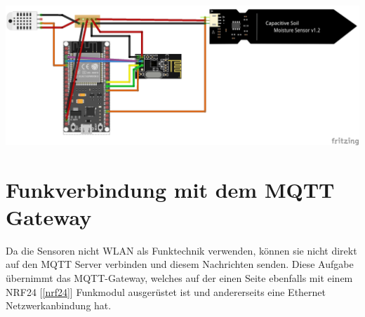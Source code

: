 \documentclass[
  12pt, %
  a4paper, %
  twoside, %
  openany, %
  numbers=noenddot, %
  BCOR=5mm, %
  parskip=half*, %
  thesis, %
]{bfhbook}
\begin{document}
  \begin{center}
    \includegraphics[width=17cm, left]{Bilder/Sensor-Design_Steckplatine.png}
    \captionsetup{justification=centering}
   \end{center}


 \section{Funkverbindung mit dem MQTT Gateway}
 Da die Sensoren nicht WLAN als Funktechnik verwenden, können sie nicht direkt auf den MQTT Server verbinden und diesem Nachrichten senden. Diese Aufgabe übernimmt das MQTT-Gateway, welches auf der einen Seite ebenfalls mit einem NRF24 [\ref{nrf24}] Funkmodul ausgerüstet ist und andererseits eine Ethernet Netzwerkanbindung hat.
 
\end{document}
